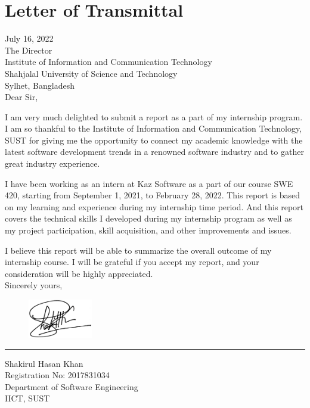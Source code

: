 \chapter*{Letter of Transmittal}

July 16, 2022\\
The Director\\
Institute of Information and Communication Technology\\
Shahjalal University of Science and Technology\\
Sylhet, Bangladesh\\

Dear Sir,

I am very much delighted to submit a report as a part of my internship program.
I am so thankful to the Institute of Information and Communication Technology, SUST for giving me the opportunity to connect my academic knowledge with the latest software development trends in a renowned software industry and to gather great industry experience.

I have been working as an intern at Kaz Software as a part of our course SWE 420, starting from September 1, 2021, to February 28, 2022.
This report is based on my learning and experience during my internship time period. And this report covers the technical skills I developed during my internship program as well as my project participation, skill acquisition, and other improvements and issues.

I believe this report will be able to summarize the overall outcome of my internship course.
I will be grateful if you accept my report, and your consideration will be highly appreciated.\\

Sincerely yours,
\begin{figure}[h]
    \includegraphics[width= 0.25\textwidth]{images/LetterOfTransmittal/mySignCropped.jpg}  
    \label{fig:mySign}
\end{figure}
\hrule height 0.4pt width 120pt
\vspace*{15pt}
Shakirul Hasan Khan\\
Registration No: 2017831034\\
Department of Software Engineering\\
IICT, SUST